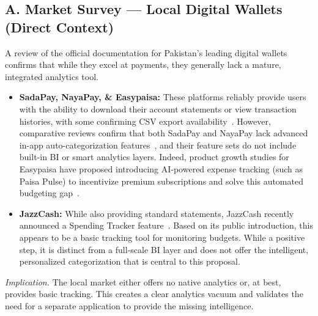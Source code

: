 \subsection{A. Market Survey — Local Digital Wallets (Direct Context)}
A review of the official documentation for Pakistan's leading digital wallets confirms that while they excel at payments, they generally lack a mature, integrated analytics tool.
\begin{itemize}
	\item \textbf{SadaPay, NayaPay, \& Easypaisa:} These platforms reliably provide users with the ability to download their account statements or view transaction histories, with some confirming CSV export availability~\cite{nayapay2023documents}. However, comparative reviews confirm that both SadaPay and NayaPay lack advanced in-app auto-categorization features~\cite{arshad2025sadapay}, and their feature sets do not include built-in BI or smart analytics layers. Indeed, product growth studies for Easypaisa have proposed introducing AI-powered expense tracking (such as Paisa Pulse) to incentivize premium subscriptions and solve this automated budgeting gap~\cite{nextleap2023easypaisa}.
	\item \textbf{JazzCash:} While also providing standard statements, JazzCash recently announced a Spending Tracker feature~\cite{jazzcash2023tracker}. Based on its public introduction, this appears to be a basic tracking tool for monitoring budgets. While a positive step, it is distinct from a full-scale BI layer and does not offer the intelligent, personalized categorization that is central to this proposal.
\end{itemize}
\textit{Implication.} The local market either offers no native analytics or, at best, provides basic tracking. This creates a clear analytics vacuum and validates the need for a separate application to provide the missing intelligence.

